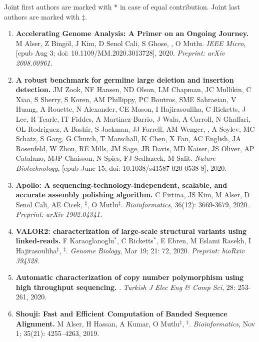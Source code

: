                                        \small{
                                         Joint first authors are marked with * in case of equal contribution. Joint last authors are marked with $\ddag$.
                                       }
\begin{enumerate}
 
 \item
 {\bf Accelerating Genome Analysis: A Primer on an Ongoing Journey.} M Alser, Z Bingöl, J Kim, D Senol Cali, S Ghose, \calkan{}, O Mutlu. {\it IEEE Micro}, [epub Aug 3; doi:   10.1109/MM.2020.3013728], 2020. \textit{Preprint: arXiv 2008.00961.}

 \item
 {\bf A robust benchmark for germline large deletion and insertion detection.}
 JM Zook, NF Hansen, ND Olson, LM Chapman, JC Mullikin, C Xiao, S Sherry, S Koren, AM Phillippy, PC Boutros, SME Sahraeian, V Huang, A Rouette, N Alexander, CE Mason, I Hajirasouliha, C Ricketts, J Lee, R Tearle, IT Fiddes, A Martinez-Barrio, J Wala, A Carroll, N Ghaffari, OL Rodriguez, A Bashir, S Jackman, JJ Farrell, AM Wenger, \calkan{}, A Soylev, MC Schatz, S Garg, G Church, T Marschall, K Chen, X Fan, AC English, JA Rosenfeld, W Zhou, RE Mills, JM Sage, JR Davis, MD Kaiser, JS Oliver, AP Catalano, MJP Chaisson, N Spies, FJ Sedlazeck, M Salit. 
 {\it Nature Biotechnology},  [epub June 15; doi: 10.1038/s41587-020-0538-8], 2020.
 
\item
{\bf Apollo: A sequencing-technology-independent, scalable, and accurate assembly polishing algorithm.} C Firtina, JS Kim, M Alser, D Senol Cali, AE Cicek, \calkan{}$^\ddag$, O Mutlu$^\ddag$. {\it Bioinformatics}, 36(12): 3669-3679, 2020.
\textit{Preprint: arXiv 1902.04341.}

\item
 {\bf VALOR2: characterization of large-scale structural variants using linked-reads.}
 F Karaoglanoglu$^*$, C Ricketts$^*$, E Ebren, M Eslami Rasekh,  I Hajirasouliha$^\ddag$, \calkan{}$^\ddag$.
{\it Genome Biology}, Mar 19; 21: 72, 2020.  \textit{Preprint: bioRxiv 394528.}



   \item
         {\bf Automatic characterization of copy number polymorphism using high throughput sequencing.}  \calkan{}. {\em Turkish J Elec Eng \& Comp Sci}, 28: 253-261, 2020.
         
\item
{\bf Shouji: Fast and Efficient Computation of Banded Sequence Alignment.} M Alser, H Hassan, A Kumar, O Mutlu$^\ddag$, \calkan{}$^\ddag$.
{\em Bioinformatics}, Nov 1;   35(21): 4255–4263, 2019.



\end{enumerate}
